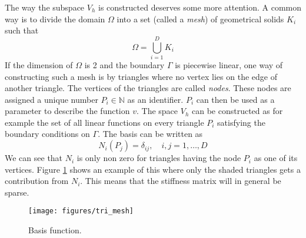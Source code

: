\documentclass[fem.tex]{subfiles}
\begin{document}
The way the subspace $V_h$ is constructed deserves some more attention.   A common way is to divide the domain $\Omega$ into a set (called a \textit{mesh})  of geometrical solids $K_i$ such that
%
\begin{equation} 
    \Omega = \bigcup_{i = 1}^D K_i
\end{equation}
%
If the dimension of $\Omega$ is 2 and the boundary $\Gamma$ is piecewise linear, one way of constructing such a mesh is by triangles where no vertex lies on the edge of another triangle. The vertices of the triangles are called \textit{nodes}. These nodes are assigned a unique number $P_i \in \mathbb{N}$ as an identifier. $P_i$ can then be used as a parameter to describe the function $v$. The space $V_h$ can be constructed as for example the set of all linear functions on every triangle $P_i$ satisfying the boundary conditions on $\Gamma$. The basis can be written as
%
\begin{equation} 
    N_i(P_j) = \delta_{ij}, \quad i,j = 1,\ldots, D
\end{equation}
%
We can see that $N_i$ is only non zero for triangles having the node $P_i$ as one of its vertices. Figure \ref{fig:tri_mesh} shows an example of this where only the shaded triangles gets a contribution from $N_i$. This means that the stiffness matrix will in general be sparse. 

\begin{figure}[ht]
\centering
\texttt{[image: figures/tri\_mesh]}
\caption{Basis function.}
\label{fig:tri_mesh}
\end{figure}
\end{document}
